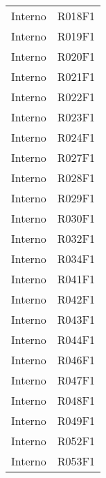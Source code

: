 \documentclass[../analisi-dei-requisiti.tex]{subfiles}
\begin{document}
\begin{longtable}[H]{ p{4cm} | p{4cm} }
  Interno                       & R018F1                               \\
  Interno                       & R019F1                               \\
  Interno                       & R020F1                               \\
  Interno                       & R021F1                               \\
  Interno                       & R022F1                               \\
  Interno                       & R023F1                               \\
  Interno                       & R024F1                               \\
  Interno                       & R027F1                               \\
  Interno                       & R028F1                               \\
  Interno                       & R029F1                               \\
  Interno                       & R030F1                               \\
  Interno                       & R032F1                               \\
  Interno                       & R034F1                               \\
  Interno                       & R041F1                               \\
  Interno                       & R042F1                               \\
  Interno                       & R043F1                               \\
  Interno                       & R044F1                               \\
  Interno                       & R046F1                               \\
  Interno                       & R047F1                               \\
  Interno                       & R048F1                               \\
  Interno                       & R049F1                               \\
  Interno                       & R052F1                               \\
  Interno                       & R053F1                               \\

\end{longtable}
\end{document}
